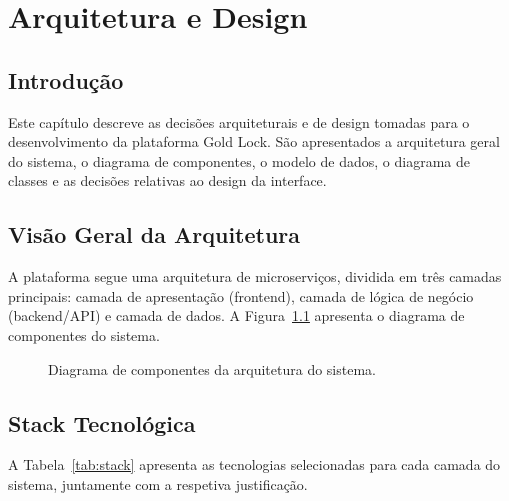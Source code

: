 \chapter{Arquitetura e Design}
\label{chap:arquitetura}

\section{Introdução}
\label{sec:arq-intro}

Este capítulo descreve as decisões arquiteturais e de design tomadas para o desenvolvimento da plataforma Gold Lock. São apresentados a arquitetura geral do sistema, o diagrama de componentes, o modelo de dados, o diagrama de classes e as decisões relativas ao design da interface.


\section{Visão Geral da Arquitetura}
\label{sec:arq-visao}

A plataforma segue uma arquitetura de microserviços, dividida em três camadas principais: camada de apresentação (frontend), camada de lógica de negócio (backend/\ac{API}) e camada de dados. A Figura~\ref{fig:arquitetura-componentes} apresenta o diagrama de componentes do sistema.

\begin{figure}[H]
\centering

\caption{Diagrama de componentes da arquitetura do sistema.}
\label{fig:arquitetura-componentes}
\end{figure}


\section{Stack Tecnológica}
\label{sec:arq-stack}

A Tabela~\ref{tab:stack} apresenta as tecnologias selecionadas para cada camada do sistema, juntamente com a respetiva justificação.

